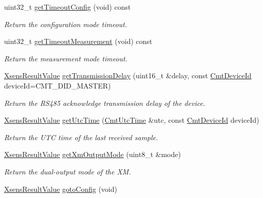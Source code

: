 \begin{DoxyCompactItemize}
uint32\-\_\-t \hyperlink{classxsens_1_1Cmt3_aea654573852d47d076751d6a4816c028}{get\-Timeout\-Config} (void) const 
\begin{DoxyCompactList}\small\item\em \-Return the configuration mode timeout. \end{DoxyCompactList}\item 
uint32\-\_\-t \hyperlink{classxsens_1_1Cmt3_a873ee706889c239ca96060abdd949158}{get\-Timeout\-Measurement} (void) const 
\begin{DoxyCompactList}\small\item\em \-Return the measurement mode timeout. \end{DoxyCompactList}\item 
\hyperlink{group__enums_ga822a2260a20af524029eef9e9a51ff6f}{\-Xsens\-Result\-Value} \hyperlink{classxsens_1_1Cmt3_a3af2873e45b43cf78a912f23855e7060}{get\-Transmission\-Delay} (uint16\-\_\-t \&delay, const \hyperlink{cmtdef_8h_a2e3b6a17360828d440ee848959918af2}{\-Cmt\-Device\-Id} device\-Id=\-C\-M\-T\-\_\-\-D\-I\-D\-\_\-\-M\-A\-S\-T\-E\-R)
\begin{DoxyCompactList}\small\item\em \-Return the \-R\-S485 acknowledge transmission delay of the device. \end{DoxyCompactList}\item 
\hyperlink{group__enums_ga822a2260a20af524029eef9e9a51ff6f}{\-Xsens\-Result\-Value} \hyperlink{classxsens_1_1Cmt3_a3c46bddf6d6c90552858c9235d2d6912}{get\-Utc\-Time} (\hyperlink{structCmtUtcTime}{\-Cmt\-Utc\-Time} \&utc, const \hyperlink{cmtdef_8h_a2e3b6a17360828d440ee848959918af2}{\-Cmt\-Device\-Id} device\-Id)
\begin{DoxyCompactList}\small\item\em \-Return the \-U\-T\-C time of the last received sample. \end{DoxyCompactList}\item 
\hyperlink{group__enums_ga822a2260a20af524029eef9e9a51ff6f}{\-Xsens\-Result\-Value} \hyperlink{classxsens_1_1Cmt3_ae1a48baa2aea900cdd7e7c2a0850450c}{get\-Xm\-Output\-Mode} (uint8\-\_\-t \&mode)
\begin{DoxyCompactList}\small\item\em \-Return the dual-\/output mode of the \-X\-M. \end{DoxyCompactList}\item 
\hyperlink{group__enums_ga822a2260a20af524029eef9e9a51ff6f}{\-Xsens\-Result\-Value} \hyperlink{classxsens_1_1Cmt3_a6d1a4f7cdad02be095d1a75d49ad1dc4}{goto\-Config} (void)

\end{DoxyCompactItemize}
